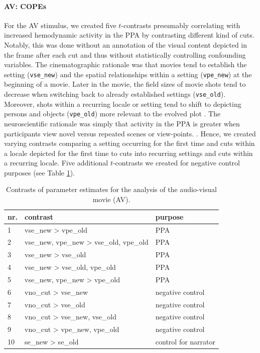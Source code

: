 \documentclass[english]{article}
\begin{document}
\paragraph{AV: COPEs}

For the AV stimulus, we created five $t$-contrasts presumably correlating with
increased hemodynamic activity in the PPA by contrasting different kind of cuts.
Notably, this was done without an annotation of the visual content depicted in
the frame after each cut and thus without statistically controlling confounding
variables.
The cinematographic rationale was that movies tend to establish the setting
(\texttt{vse\_new}) and the spatial relationships within a setting
(\texttt{vpe\_new}) at the beginning of a movie.
Later in the movie, the field sizes of movie shots tend to decrease when
switching back to already established settings (\texttt{vse\_old}).
Moreover, shots within a recurring locale or setting tend to shift to depicting
persons and objects (\texttt{vpe\_old}) more relevant to the evolved plot
\citep{brown2012cinematography, mercado2011filmmakers}.
The neuroscientific rationale was simply that activity in the PPA is
greater when participants view novel versus repeated scenes or view-points.
\citep{epstein1999parahippocampal}.
Hence, we created varying contrasts comparing a setting occurring for the first
time and cuts within a locale depicted for the first time to cuts into recurring
settings and cuts within a recurring locale.
Five additional $t$-contrasts we created for negative control purposes (see
Table \ref{tab:av-contrasts}).

\begin{table}[t]
    \caption{Contrasts of parameter estimates for the analysis of the audio-visual movie (AV).}
\label{tab:av-contrasts}
\footnotesize
\begin{tabular}{lll}
\toprule
\textbf{nr.} &  \textbf{contrast} & \textbf{purpose} \\
\midrule
1 & vse\_new > vpe\_old & PPA \tabularnewline
2 & vse\_new, vpe\_new > vse\_old, vpe\_old & PPA \tabularnewline
3 & vse\_new > vse\_old & PPA \tabularnewline
4 & vse\_new > vse\_old, vpe\_old & PPA \tabularnewline
5 & vse\_new, vpe\_new > vpe\_old & PPA \tabularnewline
6 & vno\_cut > vse\_new & negative control \tabularnewline
7 & vno\_cut > vse\_old & negative control \tabularnewline
8 & vno\_cut > vse\_new, vse\_old & negative control \tabularnewline
9 & vno\_cut > vpe\_new, vpe\_old & negative control \tabularnewline
10 & se\_new > se\_old & control for narrator \tabularnewline
\end{tabular}
\end{table}
\end{document}
